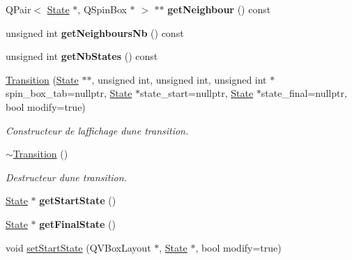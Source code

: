 \begin{DoxyCompactItemize}
\item 
\mbox{\label{class_transition_a057be20730144fe106696c0633f94dc8}} 
Q\+Pair$<$ \mbox{\hyperlink{class_state}{State}} $\ast$, Q\+Spin\+Box $\ast$ $>$ $\ast$$\ast$ {\bfseries get\+Neighbour} () const
\item 
\mbox{\label{class_transition_aec46ce821f61fcdc238d6912734c6e1f}} 
unsigned int {\bfseries get\+Neighbours\+Nb} () const
\item 
\mbox{\label{class_transition_ac52f19a36f0c0429fa43ec4619bf969a}} 
unsigned int {\bfseries get\+Nb\+States} () const
\item 
\mbox{\hyperlink{class_transition_a6d2c6fd218c006b68e9074f0f75fd28c}{Transition}} (\mbox{\hyperlink{class_state}{State}} $\ast$$\ast$, unsigned int, unsigned int, unsigned int $\ast$spin\+\_\+box\+\_\+tab=nullptr, \mbox{\hyperlink{class_state}{State}} $\ast$state\+\_\+start=nullptr, \mbox{\hyperlink{class_state}{State}} $\ast$state\+\_\+final=nullptr, bool modify=true)
\begin{DoxyCompactList}\small\item\em Constructeur de l\textquotesingle{}affichage d\textquotesingle{}une transition. \end{DoxyCompactList}\item 
\mbox{\label{class_transition_ab66e8623f23c71cd4f07c69596427bab}} 
\mbox{\hyperlink{class_transition_ab66e8623f23c71cd4f07c69596427bab}{$\sim$\+Transition}} ()
\begin{DoxyCompactList}\small\item\em Destructeur d\textquotesingle{}une transition. \end{DoxyCompactList}\item 
\mbox{\label{class_transition_a6fe4a5430b5badf1671cc2be40bc232f}} 
\mbox{\hyperlink{class_state}{State}} $\ast$ {\bfseries get\+Start\+State} ()
\item 
\mbox{\label{class_transition_a42a8c2cf0540c8c2ac7b19fbc8da33aa}} 
\mbox{\hyperlink{class_state}{State}} $\ast$ {\bfseries get\+Final\+State} ()
\item 
void \mbox{\hyperlink{class_transition_a45d8d414c5bfa455f15bd2a5d623237f}{set\+Start\+State}} (Q\+V\+Box\+Layout $\ast$, \mbox{\hyperlink{class_state}{State}} $\ast$, bool modify=true)

\end{DoxyCompactItemize}
